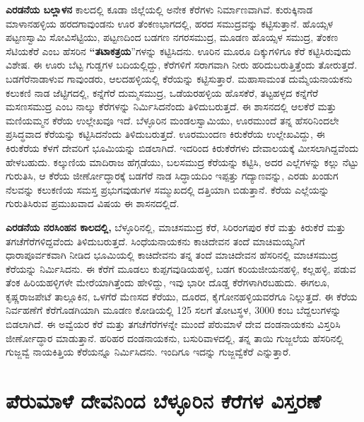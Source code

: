 \textbf{ಎರಡನೆಯ ಬಲ್ಲಾಳನ} ಕಾಲದಲ್ಲಿ ಕೂಡಾ ಜಿಲ್ಲೆಯಲ್ಲಿ ಅನೇಕ ಕೆರೆಗಳು ನಿರ್ಮಾಣವಾಗಿವೆ. ಕುರುಕ್ಕಿನಾಡ ಮಾಳಾನಹಳ್ಳಿಯ ಹರದಗಾವುಂಡನು ಊರ ತೆಂಕಣಭಾಗದಲ್ಲಿ, ಹರದ ಸಮುದ್ರವನ್ನು ಕಟ್ಟಿಸುತ್ತಾನೆ. ಹೊಯ್ಸಳ ಪಟ್ಟಣಸ್ವಾಮಿ ಸೋವಿಸೆಟ್ಟಿಯು, ಪಟ್ಟಣದಿಂದ ಬಡಗಣ ನಗರಸಮುದ್ರ, ಮೂಡಣ ಹೊಯ್ಸಳ ಸಮುದ್ರ, ತೆಂಕಣ ಸೆಟಿಯಕೆರೆ ಎಂಬ ಹೆಸರಿನ \textbf{“ತಟಾಕತ್ರಯ}”ಗಳನ್ನು ಕಟ್ಟಿಸಿದನು. ಊರಿನ ಮೂರೂ ದಿಕ್ಕುಗಳಿಗೂ ಕೆರೆ ಕಟ್ಟಿಸಿರುವುದು ವಿಶೇಷ. ಈ ಊರು ಬೆಟ್ಟ ಗುಡ್ಡಗಳ ಬದಿಯಲ್ಲಿದ್ದು, ಕೆರೆಗಳಿಗೆ ಸರಾಗವಾಗಿ ನೀರು ಹರಿದುಬರುತ್ತಿತ್ತೆಂದು ತೋರುತ್ತದೆ. ಬಡಗೆರೆನಾಡಾಳುವ ಗಾವುಂಡರು, ಆಲದಹಳ್ಳಿಯಲ್ಲಿ ಕೆರೆಯನ್ನು ಕಟ್ಟಿಸುತ್ತಾರೆ. ಮಹಾಸಾಮಂತ ದುಮ್ಮೆಯನಾಯಕನು ಕಲುಕಣಿ ನಾಡ ಜೆಟ್ಟಿಗದಲ್ಲಿ, ಕನ್ನೆಗೆರೆ ದುಮ್ಮಸಮುದ್ರ, ಒಡೆಯರಹಳ್ಳಿಯ ಹೊಸಕೆರೆ, ತಟ್ಟಹಳ್ಳದ ಕನ್ನೆಗೆರೆ ಮಸಣಸಮುದ್ರ ಎಂಬ ನಾಲ್ಕು ಕೆರೆಗಳನ್ನು ನಿರ್ಮಿಸಿದನೆಂದು ತಿಳಿದುಬರುತ್ತದೆ. ಈ ಶಾಸನದಲ್ಲಿ ಆಲಕೆರೆ ಮತ್ತು ಮಣಿಯಮ್ಮನ ಕೆರೆಯ ಉಲ್ಲೇಖವೂ ಇದೆ. ಬೆಳ್ಳೂರಿನ ಮಂಡಲಸ್ವಾಮಿಯು, ಊರಮುಂದೆ ತನ್ನ ಹೆಸರಿನಿಂದಲೇ ಪ್ರಸಿದ್ಧವಾದ ಕೆರೆಯನ್ನು ಕಟ್ಟಿಸಿದನೆಂದು ತಿಳಿದುಬರುತ್ತದೆ. ಊರಮುಂದಣ ಕಿರುಕೆರೆಯ ಉಲ್ಲೇಖವಿದ್ದು, ಈ ಕಿರುಕೆರೆಯ ಕೆಳಗೆ ದೇವರಿಗೆ ಭೂಮಿಯನ್ನು ಬಿಡಲಾಗಿದೆ. ಇದರಿಂದ ಕಿರುಕೆರೆಗಳು ದೇವಾಲಯಕ್ಕೆ ಮೀಸಲಾಗಿದ್ದವೆಂದು ಹೇಳಬಹುದು. ಕಲ್ಕುಣಿಯ ಮಾದಿರಾಜ ಹೆಗ್ಗಡೆಯು, ಬಲಸಮುದ್ರ ಕೆರೆಯನ್ನು ಕಟ್ಟಿಸಿ, ಅದರ ಎಲ್ಲೆಗಳನ್ನು ಕಲ್ಲು ನೆಟ್ಟು ಗುರುತಿಸಿ, ಆ ಕೆರೆಯ ಜೀರ್ಣೋದ್ಧಾರಕ್ಕೆ ಬಡಗೆರೆ ನಾಡ ಸಿದ್ಧಾಯದಿಂ ಇಪ್ಪತ್ತು ಗದ್ಯಾಣವನ್ನು, ಎರಡು ಖಂಡುಗ ನೆಲವನ್ನು ಕಲುಕಣಿಯ ಸಮಸ್ತ ಪ್ರಭುಗವುಡುಗಳ ಸಮ್ಮುಖದಲ್ಲಿ ದತ್ತಿಯಾಗಿ ಬಿಡುತ್ತಾನೆ. ಕೆರೆಯ ಎಲ್ಲೆಯನ್ನು ಗುರುತಿಸಿರುವ ಪ್ರಮುಖವಾದ ವಿಷಯ ಈ ಶಾಸನದಲ್ಲಿದೆ.

\textbf{ಎರಡನೆಯ ನರಸಿಂಹನ ಕಾಲದಲ್ಲಿ,} ಬೆಳ್ಳೂರಿನಲ್ಲಿ, ಮಾಚಸಮುದ್ರ ಕೆರೆ, ಸಿರಿರಂಗಪುರ ಕೆರೆ ಮತ್ತು ಕಿರುಕೆರೆ ಮತ್ತು ತಗಚೆಗೆರೆಗಳಿದ್ದವೆಂದು ತಿಳಿದುಬರುತ್ತದೆ. ಸಿಂಧೆಯನಾಯಕನು ಕಾಚಿದೇವನ ತಂದೆ ಮಾಚಿಮಯ್ಯನಿಗೆ ಧಾರಾಪೂರ್ವಕವಾಗಿ ನೀಡಿದ ಭೂಮಿಯಲ್ಲಿ ಕಾಚಿದೇವನು ತನ್ನ ತಂದೆ ಮಾಚಿದೇವನ ಹೆಸರಿನಲ್ಲಿ ಮಾಚಸಮುದ್ರ ಕೆರೆಯನ್ನು ನಿರ್ಮಿಸಿದನು. ಈ ಕೆರೆಗೆ ಮೂಡಲು ಕುಪ್ಪಗವುಡಿಯಹಳ್ಳಿ, ಬಡಗ ಕರಿಯಜೀಯನಹಳ್ಳಿ, ಕಲ್ಲಹಳ್ಳಿ, ಪಡುವ ತೆಂಕ ಹಿರಿಯಹಳ್ಳಿಗಳೇ ಮೇರೆಯಾಗಿತ್ತೆಂದು ಹೇಳಿದ್ದು, ಇವು ಭಾರೀ ದೊಡ್ಡ ಕೆರೆಗಳಾಗಿರಬಹುದು. ಈಗಲೂ, ಕೃಷ್ಣರಾಜಪೇಟೆ ತಾಲ್ಲೂಕಿನ, ಒಳಗೆರೆ ಮೆಣಸದ ಕೆರೆಯು, ದೂರದ, ಕೈಗೋನಹಳ್ಳಿಯವರೆಗೂ ನಿಲ್ಲುತ್ತದೆ. ಈ ಕೆರೆಯ ನಿರ್ವಹಣೆಗೆ ಕೆರೆಗೊಡಗಿಯಾಗಿ ಮೂಡಣ ಕೋಡಿಯಲ್ಲಿ 125 ಸಲಗೆ ತೋಟಸ್ಥಳ, 3000 ಕಂಬ ಬೆದ್ದಲುಗಳನ್ನು ಬಿಡಲಾಗಿದೆ. ಈ ಅವ್ವೆಯರ ಕೆರೆ ಮತ್ತು ತಗಚೆಗೆರೆಗಳನ್ನೇ ಮುಂದೆ ಪೆರುಮಾಳೆ ದೇವ ದಂಡನಾಯಕನು ವಿಸ್ತರಿಸಿ ಜೀರ್ಣೋದ್ಧಾರ ಮಾಡುತ್ತಾನೆ. ಹರಿಹರ ದಂಡನಾಯಕನು, ಬಸುರಿವಾಳದಲ್ಲಿ, ತನ್ನ ತಾಯಿ ಗುಜ್ಜಲೆಯ ಹೆಸರಿನಲ್ಲಿ ಗುಜ್ಜವ್ವೆ ನಾಯಕಿತ್ತಿಯ ಕೆರೆಯನ್ನೂ ನಿರ್ಮಿಸಿದನು. ಇಂದಿಗೂ ಇದನ್ನು ಗುಜ್ಜವ್ವೆಕೆರೆ ಎನ್ನುತ್ತಾರೆ.


\section{ಪೆರುಮಾಳೆ ದೇವನಿಂದ ಬೆಳ್ಳೂರಿನ ಕೆರೆಗಳ ವಿಸ್ತರಣೆ}


